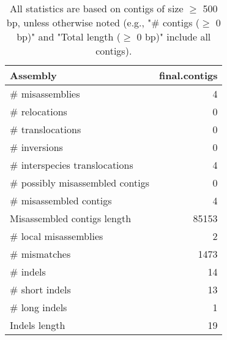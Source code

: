 \documentclass[12pt,a4paper]{article}
\begin{document}
\begin{table}[ht]
\begin{center}
\caption{All statistics are based on contigs of size $\geq$ 500 bp, unless otherwise noted (e.g., "\# contigs ($\geq$ 0 bp)" and "Total length ($\geq$ 0 bp)" include all contigs).}
\begin{tabular}{|l*{1}{|r}|}
\hline
Assembly & final.contigs \\ \hline
\# misassemblies & 4 \\ \hline
\hspace{5mm}\# relocations & 0 \\ \hline
\hspace{5mm}\# translocations & 0 \\ \hline
\hspace{5mm}\# inversions & 0 \\ \hline
\hspace{5mm}\# interspecies translocations & 4 \\ \hline
\# possibly misassembled contigs & 0 \\ \hline
\# misassembled contigs & 4 \\ \hline
Misassembled contigs length & 85153 \\ \hline
\# local misassemblies & 2 \\ \hline
\# mismatches & 1473 \\ \hline
\# indels & 14 \\ \hline
\hspace{5mm}\# short indels & 13 \\ \hline
\hspace{5mm}\# long indels & 1 \\ \hline
Indels length & 19 \\ \hline
\end{tabular}
\end{center}
\end{table}
\end{document}
